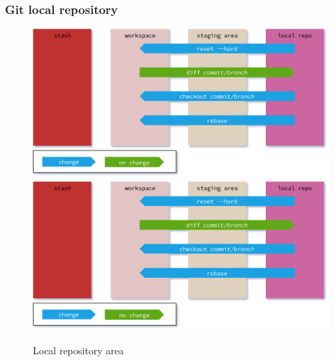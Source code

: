 \begin{frame}
    \frametitle{Git local repository}
    \addtocounter{page}{-1}
    \begin{figure}
        \begin{center}
            {
                \includegraphics[width=1\textwidth,keepaspectratio]{./images/GitAreas-LocalRepo.png}
            }
            {
                \includegraphics[height=0.75\textheight,keepaspectratio]{./images/GitAreas-LocalRepo.png}
            }
            \caption{Local repository area}
        \end{center}
    \end{figure}
\end{frame}

